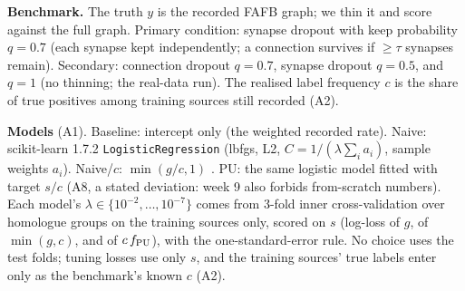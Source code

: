 \documentclass[conference]{IEEEtran}
\begin{document}
\textbf{Benchmark.} The truth $y$ is the recorded FAFB graph; we thin it and score against the full graph. Primary condition: synapse dropout with keep probability $q=0.7$ (each synapse kept independently; a connection survives if $\ge\tau$ synapses remain). Secondary: connection dropout $q=0.7$, synapse dropout $q=0.5$, and $q=1$ (no thinning; the real-data run). The realised label frequency $c$ is the share of true positives among training sources still recorded (A2).

\textbf{Models} (A1). Baseline: intercept only (the weighted recorded rate). Naive: scikit-learn 1.7.2 \texttt{LogisticRegression} (lbfgs, L2, $C=1/(\lambda\sum_i a_i)$, sample weights $a_i$). Naive/$c$: $\min(g/c,1)$ \cite{elkan2008}. PU: the same logistic model fitted with target $s/c$ (A8, a stated deviation: week 9 also forbids from-scratch numbers). Each model's $\lambda\in\{10^{-2},\dots,10^{-7}\}$ comes from 3-fold inner cross-validation over homologue groups on the training sources only, scored on $s$ (log-loss of $g$, of $\min(g,c)$, and of $c\,f_{\rm PU}$), with the one-standard-error rule. No choice uses the test folds; tuning losses use only $s$, and the training sources' true labels enter only as the benchmark's known $c$ (A2).
\end{document}
